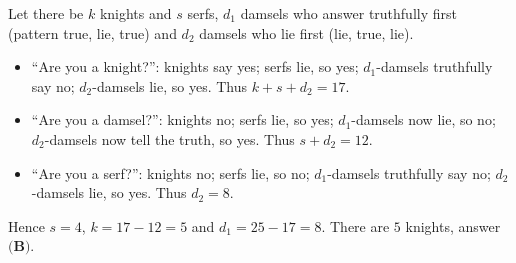 Let there be $k$ knights and $s$ serfs, $d_1$ damsels who answer truthfully first (pattern true, lie, true) and $d_2$ damsels who lie first (lie, true, lie).

\begin{itemize}
\item ``Are you a knight?'': knights say yes; serfs lie, so yes; $d_1$-damsels truthfully say no; $d_2$-damsels lie, so yes. Thus $k+s+d_2=17$.
\item ``Are you a damsel?'': knights no; serfs lie, so yes; $d_1$-damsels now lie, so no; $d_2$-damsels now tell the truth, so yes. Thus $s+d_2=12$.
\item ``Are you a serf?'': knights no; serfs lie, so no; $d_1$-damsels truthfully say no; $d_2$-damsels lie, so yes. Thus $d_2=8$.
\end{itemize}
Hence $s=4$, $k=17-12=5$ and $d_1=25-17=8$. There are $\boxed{5}$ knights, answer $\textbf{(B)}$.
